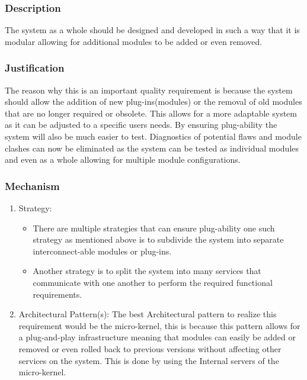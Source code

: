 \subsubsection*{Description}
The system as a whole should be designed and developed in such a way that it is modular allowing for additional modules to be added or even removed.
\subsubsection*{Justification}
The reason why this is an important quality requirement is because the system should allow the addition of new plug-ins(modules) or the removal of old modules that are no longer required or obsolete. This allows for a more adaptable system as it can be adjusted to a specific users needs. By ensuring plug-ability the system will also be much easier to test. Diagnostics of potential flaws and module clashes can now be eliminated as the system can be tested as individual modules and even as a whole allowing for multiple module configurations.
\subsubsection*{Mechanism}
	\begin{enumerate}
		\item Strategy:
		 \begin{itemize}
			\item There are multiple strategies that can ensure plug-ability one such strategy as mentioned above is to subdivide the system into separate interconnect-able modules or plug-ins.
			\item Another strategy is to split the system into many services that communicate with one another to perform the required functional requirements.
		\end{itemize}
		\item Architectural Pattern(s):
		 The best Architectural pattern to realize this requirement would be the micro-kernel, this is because this pattern allows for a plug-and-play infrastructure meaning that modules can easily be added or removed or even rolled back to previous versions without affecting other services on the system. This is done by using the Internal servers of the micro-kernel. 
	\end{enumerate}